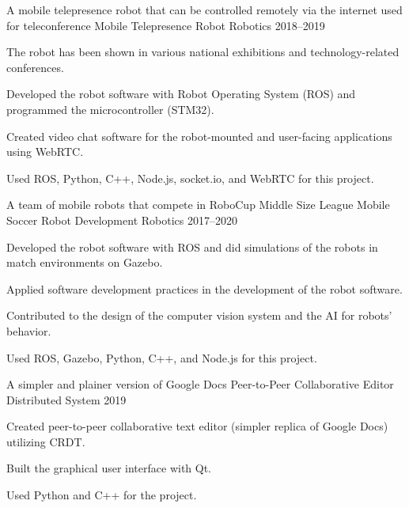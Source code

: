 

\begin{cventries}
	\cventry
	{A mobile telepresence robot that can be controlled remotely via the internet used for teleconference} %
	{Mobile Telepresence Robot} %
	{Robotics} %
	{2018--2019} %
	{
		\begin{cvitems} %
			\item {The robot has been shown in various national exhibitions and technology-related conferences.}
			\item {Developed the robot software with Robot Operating System (ROS) and programmed the microcontroller (STM32).}
			\item {Created video chat software for the robot-mounted and user-facing applications using WebRTC.}
			\item {Used ROS, Python, C++, Node.js, socket.io, and WebRTC for this project.}
		\end{cvitems}
	}
    
    \cventry
    {A team of mobile robots that compete in RoboCup Middle Size League} %
    {Mobile Soccer Robot Development} %
    {Robotics} %
    {2017--2020} %
    {
    	\begin{cvitems} %
    		\item {Developed the robot software with ROS and did simulations of the robots in match environments on Gazebo.}
    		\item {Applied software development practices in the development of the robot software.}
    		\item {Contributed to the design of the computer vision system and the AI for robots' behavior.}
    		\item {Used ROS, Gazebo, Python, C++, and Node.js for this project.}
    	\end{cvitems}
    }
    
    \cventry
    {A simpler and plainer version of Google Docs} %
    {Peer-to-Peer Collaborative Editor} %
    {Distributed System} %
    {2019} %
    {
    	\begin{cvitems} %
    		\item {Created peer-to-peer collaborative text editor (simpler replica of Google Docs) utilizing CRDT.}
    		\item {Built the graphical user interface with Qt.}
    		\item {Used Python and C++ for the project.}
    	\end{cvitems}
    }
    

\end{cventries}
